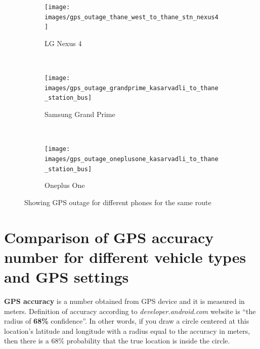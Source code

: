 \documentclass[12pt]{report}
\begin{document}
 \begin{figure}[h!]
   \centering
   \begin{subfigure}[t]{0.33\textwidth}
     \centering
     \texttt{[image: images/gps\_outage\_thane\_west\_to\_thane\_stn\_nexus4]}
     \caption{LG Nexus 4}
     \label{gps_outage_nexus4}
   \end{subfigure}%
   ~
   \begin{subfigure}[t]{0.33\textwidth}
     \centering
     \texttt{[image: images/gps\_outage\_grandprime\_kasarvadli\_to\_thane\_station\_bus]}
     \caption{Samsung Grand Prime}
     \label{gps_outage_gp}
   \end{subfigure}%
   ~
   \begin{subfigure}[t]{0.33\textwidth}
     \centering
     \texttt{[image: images/gps\_outage\_oneplusone\_kasarvadli\_to\_thane\_station\_bus]}
     \caption{Oneplus One}
     \label{gps_outage_oneplusone}
   \end{subfigure}
   \caption{Showing GPS outage for different phones for the same route}
   \label{gps_outage_fig}
 \end{figure}

 \newpage
 \section{Comparison of GPS accuracy number for different vehicle types and GPS
   settings}

 \label{gps_accuracy_for_different_gps_settings_and_vehicle_types}

 \textbf{GPS accuracy} is a number obtained from GPS device and it is measured
 in meters. Definition of accuracy according to \textit{developer.android.com}
 \cite{android} website is ``the radius of \textbf{68\%} confidence''. In other
 words, if you draw a circle centered at this location's latitude and longitude
 with a radius equal to the accuracy in meters, then there is a 68\% probability
 that the true location is inside the circle.
\end{document}
